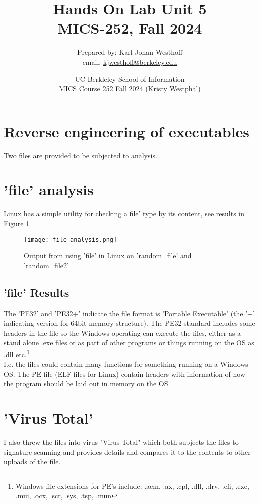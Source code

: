 \documentclass[
	letterpaper, %
	10pt, %
	unnumberedsections, %
	twoside, %
]{APAAssignment}
\title{Hands On Lab Unit 5 \\ MICS-252, Fall 2024} %
\date{UC Berkleley School of Information \\
MICS Course 252 Fall 2024 (Kristy Westphal)
}
\author{
	Prepared by: Karl-Johan Westhoff \\
	email: \href{mailto:kjwesthoff@berkeley.edu}{kjwesthoff@berkeley.edu}
}
\begin{document}
\onecolumn
\maketitle %



\section{Reverse engineering of executables}\label{log-analysis}
Two files are provided to be subjected to analysis.

\section{'file' analysis}
Linux has a simple utility for checking a file' type by its content, see results in Figure \ref{fig:fileAnalysis}
\begin{figure}[!htp] %
	\centering
	\texttt{[image: file\_analysis.png]}
	\caption{Output from using 'file' in Linux on 'random\_file' and 'random\_file2'}
	\label{fig:fileAnalysis}
\end{figure}

\subsection{'file' Results} The 'PE32' and 'PE32+' indicate the file format is 'Portable Executable' (the '+' indicating version for 64bit memory structure)\cite{PE32Wikipedia}. The PE32 standard includes some headers in the file so the Windows operating can execute the files, either as a stand alone .exe files or as part of other programs or things running on the OS as .dll etc.\footnote{Windows file extensions for PE's include: .acm, .ax, .cpl, .dll, .drv, .efi, .exe, .mui, .ocx, .scr, .sys, .tsp, .mun\cite{PE32Wikipedia}} \\
I.e. the files could contain many functions for something running on a Windows OS. The PE file (ELF files for Linux) contain headers with information of how the program should be laid out in memory on the OS.

\section{'Virus Total'}\label{sec:ViruTotal}
I also threw the files into virus "Virus Total"\cite{VirusTotal} which both subjects the files to signature scanning and provides details and compares it to the contents to other uploads of the file.
\end{document}
